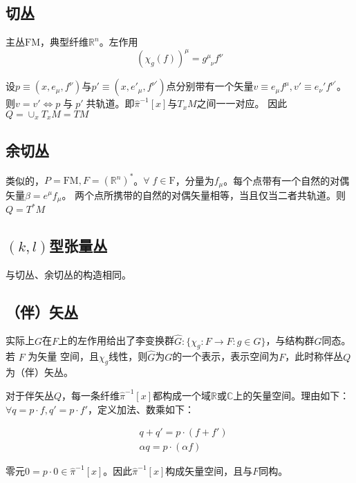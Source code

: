 \documentclass{ctexbook}
\begin{document}
\subsection{切丛}

主丛$\mathrm{FM}$，典型纤维$\mathbb{R}^n$。左作用
\begin{equation}
    (\chi_g(f))^\mu=g^{\mu}_{\;\;\nu}f^\nu
\end{equation}

设$p\equiv(x,e_\mu,f^\nu)$与$p'\equiv(x,e'_\mu,f^{\nu'})$点分别带有一个矢量$v \equiv e_\mu f^{\mu},v'\equiv e_\nu'f^{\nu'}$。则$v=v'\Leftrightarrow p\;\text{与}\;p'\;\text{共轨道}$。即$\hat{\pi}^{-1}[x]$与$T_x M$之间一一对应。
因此$Q=\cup_x{T_x M}=TM$

\subsection{余切丛}

类似的，$P=\mathrm{FM},F=(\mathbb{R}^n)^*$。$\forall\;f\in\mathrm{F}$，分量为$f_\mu$。每个点带有一个自然的对偶矢量$\beta=e^\mu f_\mu$。 两个点所携带的自然的对偶矢量相等，当且仅当二者共轨道。则$Q=T^* M$

\subsection{$(k,l)$型张量丛}

与切丛、余切丛的构造相同。

\subsection{（伴）矢丛}

实际上$G$在$F$上的左作用给出了李变换群$\hat{G}:\{\chi_g\colon F\to F:g\in G\}$，与结构群$G$同态。若 $F$ 为矢量 空间，且$\chi_g$线性，则$\hat{G}$为$G$的一个表示，表示空间为$F$，此时称伴丛$Q$为（伴）矢丛。

对于伴矢丛$Q$，每一条纤维$\hat{\pi}^{-1}[x]$都构成一个域$\mathbb{R}$或$\mathbb{C}$上的矢量空间。理由如下：$\forall q=p\cdot f,q'=p\cdot f'$，定义加法、数乘如下：

\begin{equation}
    \begin{split}
        & q+q'=p\cdot(f+f')\\
        & \alpha q=p\cdot(\alpha f)
    \end{split}
\end{equation}

零元$0=p\cdot0\in\hat{\pi}^{-1}[x]$。因此$\hat{\pi}^{-1}[x]$构成矢量空间，且与$F$同构。
\end{document}
